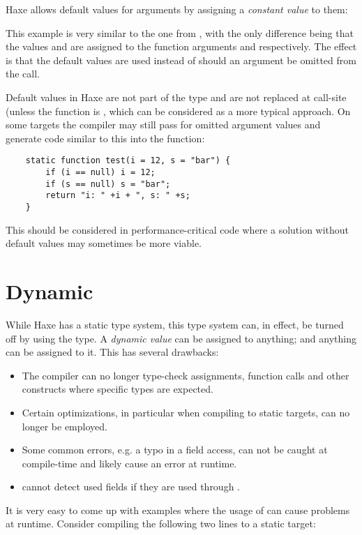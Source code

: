Haxe allows default values for arguments by assigning a \emph{constant value} to them:

This example is very similar to the one from , with the only difference being that the values  and  are assigned to the function arguments  and  respectively. The effect is that the default values are used instead of  should an argument be omitted from the call.


Default values in Haxe are not part of the type and are not replaced at call-site (unless the function is , which can be considered as a more typical approach. On some targets the compiler may still pass  for omitted argument values and generate code similar to this into the function:
\begin{lstlisting}
	static function test(i = 12, s = "bar") {
		if (i == null) i = 12;
		if (s == null) s = "bar";
		return "i: " +i + ", s: " +s;
	}
\end{lstlisting}
This should be considered in performance-critical code where a solution without default values may sometimes be more viable.




\section{Dynamic}
\label{types-dynamic}

While Haxe has a static type system, this type system can, in effect, be turned off by using the  type. A \emph{dynamic value} can be assigned to anything; and anything can be assigned to it. This has several drawbacks:

\begin{itemize}
	\item The compiler can no longer type-check assignments, function calls and other constructs where specific types are expected.
	\item Certain optimizations, in particular when compiling to static targets, can no longer be employed.
	\item Some common errors, e.g. a typo in a field access, can not be caught at compile-time and likely cause an error at runtime.
	\item {} cannot detect used fields if they are used through .
\end{itemize}
It is very easy to come up with examples where the usage of  can cause problems at runtime. Consider compiling the following two lines to a static target:

